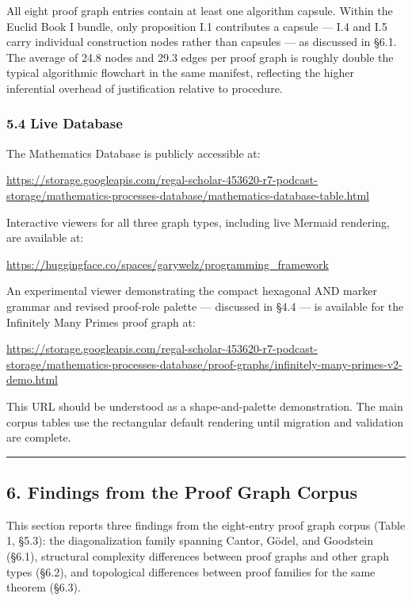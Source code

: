 \documentclass[
  11pt]{article}
\begin{document}
All eight proof graph entries contain at least one algorithm capsule.
Within the Euclid Book I bundle, only proposition I.1 contributes a
capsule --- I.4 and I.5 carry individual construction nodes rather than
capsules --- as discussed in §6.1. The average of 24.8 nodes and 29.3
edges per proof graph is roughly double the typical algorithmic
flowchart in the same manifest, reflecting the higher inferential
overhead of justification relative to procedure.

\hypertarget{54-live-database}{%
\subsubsection{5.4 Live Database}\label{54-live-database}}

The Mathematics Database is publicly accessible at:

\url{https://storage.googleapis.com/regal-scholar-453620-r7-podcast-storage/mathematics-processes-database/mathematics-database-table.html}

Interactive viewers for all three graph types, including live Mermaid
rendering, are available at:

\url{https://huggingface.co/spaces/garywelz/programming_framework}

An experimental viewer demonstrating the compact hexagonal AND marker
grammar and revised proof-role palette --- discussed in §4.4 --- is
available for the Infinitely Many Primes proof graph at:

\url{https://storage.googleapis.com/regal-scholar-453620-r7-podcast-storage/mathematics-processes-database/proof-graphs/infinitely-many-primes-v2-demo.html}

This URL should be understood as a shape-and-palette demonstration. The
main corpus tables use the rectangular default rendering until migration
and validation are complete.

\begin{center}\rule{0.5\linewidth}{0.5pt}\end{center}

\hypertarget{6-findings-from-the-proof-graph-corpus}{%
\subsection{6. Findings from the Proof Graph
Corpus}\label{6-findings-from-the-proof-graph-corpus}}

This section reports three findings from the eight-entry proof graph
corpus (Table 1, §5.3): the diagonalization family spanning Cantor,
Gödel, and Goodstein (§6.1), structural complexity differences between
proof graphs and other graph types (§6.2), and topological differences
between proof families for the same theorem (§6.3).
\end{document}
